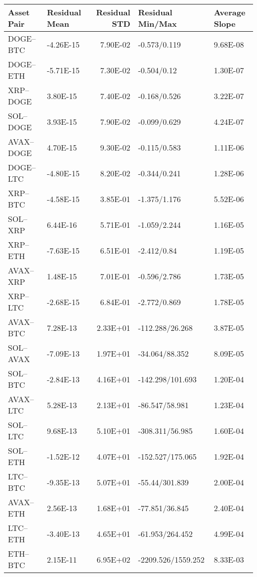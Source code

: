 \begin{tabular}{llrll}
\toprule
Asset Pair & Residual Mean & Residual STD & Residual Min/Max & Average Slope \\
\midrule
DOGE–BTC & -4.26E-15 & 7.90E-02 & -0.573/0.119 & 9.68E-08 \\
DOGE–ETH & -5.71E-15 & 7.30E-02 & -0.504/0.12 & 1.30E-07 \\
XRP–DOGE & 3.80E-15 & 7.40E-02 & -0.168/0.526 & 3.22E-07 \\
SOL–DOGE & 3.93E-15 & 7.90E-02 & -0.099/0.629 & 4.24E-07 \\
AVAX–DOGE & 4.70E-15 & 9.30E-02 & -0.115/0.583 & 1.11E-06 \\
DOGE–LTC & -4.80E-15 & 8.20E-02 & -0.344/0.241 & 1.28E-06 \\
XRP–BTC & -4.58E-15 & 3.85E-01 & -1.375/1.176 & 5.52E-06 \\
SOL–XRP & 6.44E-16 & 5.71E-01 & -1.059/2.244 & 1.16E-05 \\
XRP–ETH & -7.63E-15 & 6.51E-01 & -2.412/0.84 & 1.19E-05 \\
AVAX–XRP & 1.48E-15 & 7.01E-01 & -0.596/2.786 & 1.73E-05 \\
XRP–LTC & -2.68E-15 & 6.84E-01 & -2.772/0.869 & 1.78E-05 \\
AVAX–BTC & 7.28E-13 & 2.33E+01 & -112.288/26.268 & 3.87E-05 \\
SOL–AVAX & -7.09E-13 & 1.97E+01 & -34.064/88.352 & 8.09E-05 \\
SOL–BTC & -2.84E-13 & 4.16E+01 & -142.298/101.693 & 1.20E-04 \\
AVAX–LTC & 5.28E-13 & 2.13E+01 & -86.547/58.981 & 1.23E-04 \\
SOL–LTC & 9.68E-13 & 5.10E+01 & -308.311/56.985 & 1.60E-04 \\
SOL–ETH & -1.52E-12 & 4.07E+01 & -152.527/175.065 & 1.92E-04 \\
LTC–BTC & -9.35E-13 & 5.07E+01 & -55.44/301.839 & 2.00E-04 \\
AVAX–ETH & 2.56E-13 & 1.68E+01 & -77.851/36.845 & 2.40E-04 \\
LTC–ETH & -3.40E-13 & 4.65E+01 & -61.953/264.452 & 4.99E-04 \\
ETH–BTC & 2.15E-11 & 6.95E+02 & -2209.526/1559.252 & 8.33E-03 \\
\bottomrule
\end{tabular}
